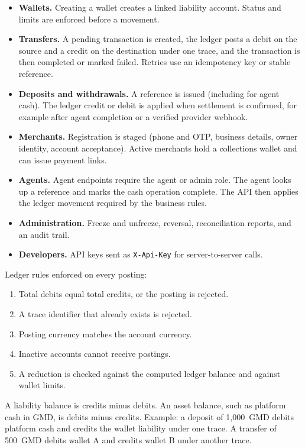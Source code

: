 \documentclass[12pt,a4paper]{article}
\begin{document}
\begin{itemize}
  \item \textbf{Wallets.} Creating a wallet creates a linked liability account. Status and limits are enforced before a movement.
  \item \textbf{Transfers.} A pending transaction is created, the ledger posts a debit on the source and a credit on the destination under one trace, and the transaction is then completed or marked failed. Retries use an idempotency key or stable reference.
  \item \textbf{Deposits and withdrawals.} A reference is issued (including for agent cash). The ledger credit or debit is applied when settlement is confirmed, for example after agent completion or a verified provider webhook.
  \item \textbf{Merchants.} Registration is staged (phone and OTP, business details, owner identity, account acceptance). Active merchants hold a collections wallet and can issue payment links.
  \item \textbf{Agents.} Agent endpoints require the agent or admin role. The agent looks up a reference and marks the cash operation complete. The API then applies the ledger movement required by the business rules.
  \item \textbf{Administration.} Freeze and unfreeze, reversal, reconciliation reports, and an audit trail.
  \item \textbf{Developers.} API keys sent as \texttt{X-Api-Key} for server-to-server calls.
\end{itemize}

Ledger rules enforced on every posting:

\begin{enumerate}
  \item Total debits equal total credits, or the posting is rejected.
  \item A trace identifier that already exists is rejected.
  \item Posting currency matches the account currency.
  \item Inactive accounts cannot receive postings.
  \item A reduction is checked against the computed ledger balance and against wallet limits.
\end{enumerate}

A liability balance is credits minus debits. An asset balance, such as platform cash in GMD, is debits minus credits. Example: a deposit of 1{,}000~GMD debits platform cash and credits the wallet liability under one trace. A transfer of 500~GMD debits wallet A and credits wallet B under another trace.
\end{document}
